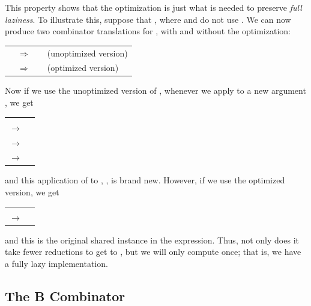 This property shows that the  optimization is just what is needed to
preserve \textit{full laziness}. To illustrate this, suppose that , where 
and  do not use . We can now produce two combinator translations for ,
with and without the  optimization:
\begin{mlcoded}
    \begin{tabular}{lll@{\quad}l}
        \ml{f = \tlb{x}p q} & $\Rightarrow$ & \ml{S (K p) (K q)} & {\normalfont\normalsize (unoptimized version)} \\
        & $\Rightarrow$ & \ml{K (p q)} & {\normalfont\normalsize (optimized version)}
    \end{tabular}
\end{mlcoded}
Now if we use the unoptimized version of , whenever we apply  to a new
argument , we get
\begin{mlcoded}
    \begin{tabular}{ll}
        & \ml{S (K p) (K q) x} \\
        $\rightarrow$ & \ml{K p x (K q x)} \\
        $\rightarrow$ & \ml{p (K q x)} \\
        $\rightarrow$ & \ml{p q}
    \end{tabular}
\end{mlcoded}
and this application of  to , , is brand new. However, if we use the
optimized version, we get
\begin{mlcoded}
    \begin{tabular}{ll}
        & \ml{K (p q) x} \\
        $\rightarrow$ & \ml{p q}
    \end{tabular}
\end{mlcoded}
and this  is the original shared instance in the  expression. Thus,
not only does it take fewer reductions to get to , but we will only compute
 once; that is, we have a fully lazy implementation.

\subsection{The B Combinator}


